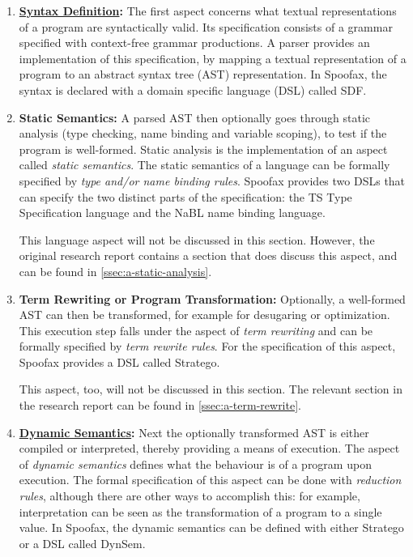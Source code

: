 \begin{enumerate}
\item \textbf{\hyperref[ssec:syntax-def]{Syntax Definition}:} The first aspect
  concerns what textual representations of a program are syntactically
  valid. Its specification consists of a grammar specified with context-free
  grammar productions. A parser provides an implementation of this
  specification, by mapping a textual representation of a program to an abstract
  syntax tree (AST) representation. In Spoofax, the syntax is declared with a
  domain specific language (DSL) called SDF.
\item \textbf{Static Semantics:} A parsed AST then optionally goes through
  static analysis (type checking, name binding and variable scoping), to test if
  the program is well-formed. Static analysis is the implementation of an aspect
  called \textit{static semantics}. The static semantics of a language can be
  formally specified by \textit{type and/or name binding rules}. Spoofax
  provides two DSLs that can specify the two distinct parts of the
  specification: the TS Type Specification language and the NaBL name binding
  language.

  This language aspect will not be discussed in this section. However, the
  original research report contains a section that does discuss this aspect, and
  can be found in \cref{ssec:a-static-analysis}.
\item \textbf{Term Rewriting or Program Transformation:} Optionally, a
  well-formed AST can then be transformed, for example for desugaring or
  optimization. This execution step falls under the aspect of \textit{term
    rewriting} and can be formally specified by \textit{term rewrite rules}. For
  the specification of this aspect, Spoofax provides a DSL called Stratego.

  This aspect, too, will not be discussed in this section. The relevant section
  in the research report can be found in \cref{ssec:a-term-rewrite}.
\item \textbf{\hyperref[ssec:dynamic-semantics]{Dynamic Semantics}:} Next the
  optionally transformed AST is either compiled or interpreted, thereby
  providing a means of execution. The aspect of \textit{dynamic semantics}
  defines what the behaviour is of a program upon execution. The formal
  specification of this aspect can be done with \textit{reduction rules},
  although there are other ways to accomplish this: for example, interpretation
  can be seen as the transformation of a program to a single value. In Spoofax,
  the dynamic semantics can be defined with either Stratego or a DSL called
  DynSem.
\end{enumerate}

